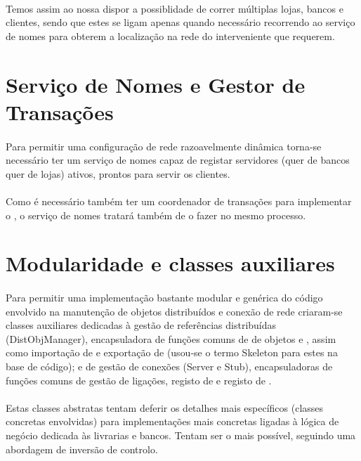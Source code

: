 \documentclass[11pt,a4paper]{report}
\begin{document}
\paragraph{}Temos assim ao nossa dispor a possiblidade de correr múltiplas lojas, bancos e clientes, sendo que estes se ligam apenas quando necessário recorrendo ao serviço de nomes para obterem a localização na rede do interveniente que requerem.

\section{Serviço de Nomes e Gestor de Transações}

\paragraph{}Para permitir uma configuração de rede razoavelmente dinâmica torna-se necessário ter um serviço de nomes capaz de registar servidores (quer de bancos quer de lojas) ativos, prontos para servir os clientes.

\paragraph{}Como é necessário também ter um coordenador de transações para implementar o , o serviço de nomes tratará também de o fazer no mesmo processo.

\section{Modularidade e classes auxiliares}

\paragraph{} Para permitir uma implementação bastante modular e genérica do código envolvido na manutenção de objetos distribuídos e conexão de rede criaram-se classes auxiliares dedicadas à gestão de referências distribuídas (DistObjManager), encapsuladora de funções comuns de  de objetos e , assim como importação de  e exportação de  (usou-se o termo Skeleton para estes na base de código); e de gestão de conexões (Server e Stub), encapsuladoras de funções comuns de gestão de ligações, registo de  e registo de .

\paragraph{} Estas classes abstratas tentam deferir os detalhes mais específicos (classes concretas envolvidas) para implementações mais concretas ligadas à lógica de negócio dedicada às livrarias e bancos. Tentam ser o mais  possível, seguindo uma abordagem de inversão de controlo.
\end{document}
